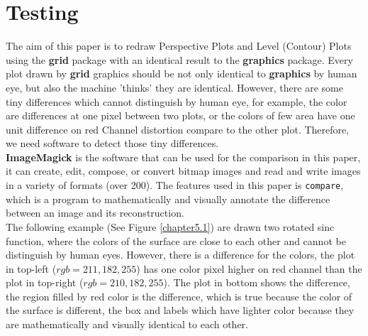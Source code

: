 \documentclass{report}
\begin{document}
\chapter{Testing}
The aim of this paper is to redraw Perspective Plots and Level (Contour) Plots using the \textbf{grid} package with an identical result to the \textbf{graphics} package. Every plot drawn by \textbf{grid} graphics should be not only identical to \textbf{graphics} by human eye, but also the machine 'thinks' they are identical. However, there are some tiny differences which cannot distinguish by human eye, for example, the color are differences at one pixel between two plots, or the colors of few area have one unit difference on red Channel distortion compare to the other plot. Therefore, we need software to detect those tiny differences.\\

\textbf{ImageMagick} \citep{ImageMagick} is the software that can be used for the comparison in this paper, it can create, edit, compose, or convert bitmap images and read and write images in a variety of formats (over 200). The features used in this paper is \texttt{compare}, which is a program to mathematically and visually annotate the difference between an image and its reconstruction.\\

The following example (See Figure \ref{chapter5.1}) are drawn two rotated sinc function, where the colors of the surface are close to each other and cannot be distinguish by human eyes. However, there is a difference for the colors, the plot in top-left ($rgb = 211, 182, 255$) has one color pixel higher on red channel than the plot in top-right ($rgb = 210, 182, 255$). The plot in bottom shows the difference, the region filled by red color is the difference, which is true because the color of the surface is different, the box and labels which have lighter color because they are mathematically and visually identical to each other. \\
\end{document}
